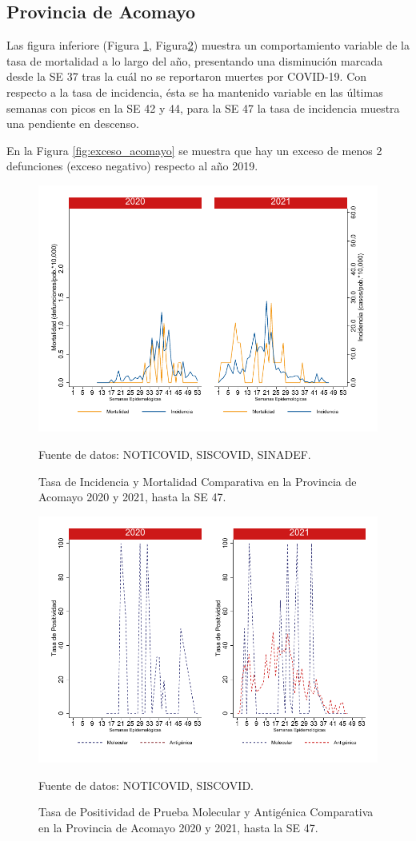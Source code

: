 \documentclass[12pt,a4paper,openany]{book}
\begin{document}
		\subsection*{Provincia de Acomayo}
		\noindent Las figura inferiore (Figura \ref{fig:inc_mort_acomayo}, Figura\ref{fig:positividad_acomayo}) muestra un comportamiento variable de la tasa de mortalidad a lo largo del año, presentando una disminución marcada desde la SE 37 tras la cuál no se reportaron muertes por COVID-19. Con respecto a la tasa de incidencia, ésta se ha mantenido variable en las últimas semanas con picos en la SE 42 y 44, para la SE 47 la tasa de incidencia muestra una pendiente en descenso. 
		
		 En la Figura \ref{fig:exceso_acomayo} se muestra que hay un exceso de menos 2 defunciones (exceso negativo) respecto al año 2019.
		
		\begin{figure}[h]
			\caption{Tasa de Incidencia y Mortalidad Comparativa en la Provincia de Acomayo 2020 y 2021, hasta la SE 47.}\label{fig:inc_mort_acomayo}
			\begin{center}
				\includegraphics[width=0.65\linewidth]{../figuras/incidencia_mortalidad_20_21_1}
			\end{center}
			{\footnotesize {Fuente de datos: NOTICOVID, SISCOVID, SINADEF.}}
		\end{figure}
		
		\begin{figure}[h]
			\caption{Tasa de Positividad de Prueba Molecular y Antigénica Comparativa en la Provincia de Acomayo 2020 y 2021, hasta la SE 47. }\label{fig:positividad_acomayo}
			\begin{center}
				\includegraphics[width=0.7\linewidth]{../figuras/positividad_20_21_1}
			\end{center}
			{\footnotesize {Fuente de datos: NOTICOVID, SISCOVID.}}
		\end{figure}
		
\end{document}
